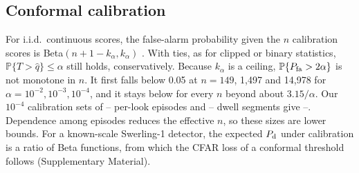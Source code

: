\documentclass[journal]{IEEEtran}
\newcommand{\PP}{\mathbb{P}}
\begin{document}
\subsection{Conformal calibration}\label{sec:calib}
For i.i.d.\ continuous scores, the false-alarm probability given the $n$ calibration scores is Beta$(n+1-k_\alpha,k_\alpha)$ \cite{vovk2012}. With ties, as for clipped or binary statistics, $\PP\{T>\widehat q\}\le\alpha$ still holds, conservatively. Because $k_\alpha$ is a ceiling, $\PP\{P_{\rm fa}>2\alpha\}$ is not monotone in $n$. It first falls below 0.05 at $n=149$, 1,497 and 14,978 for $\alpha=10^{-2},10^{-3},10^{-4}$, and it stays below for every $n$ beyond about $3.15/\alpha$. Our $10^{-4}$ calibration sets of \LowCalMin--\LowCalMax{} per-look episodes and \DwellCalMin--\DwellCalMax{} dwell segments give \LowCalPtwoMin--\LowCalPtwoMax. Dependence among episodes reduces the effective $n$, so these sizes are lower bounds. For a known-scale Swerling-1 detector, the expected $P_{\rm d}$ under calibration is a ratio of Beta functions, from which the CFAR loss of a conformal threshold follows \cite{watts2007cfarloss} (Supplementary Material).
\end{document}
